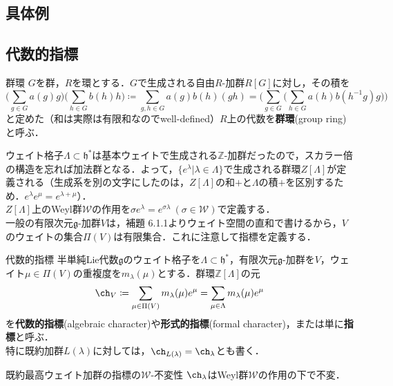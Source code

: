 \documentclass[rep_main]{subfiles}
\begin{document}
\subsection{具体例}
\subsection{代数的指標}

\begin{mydef}[label=def:group-ring]{群環}
	$G$を群，$R$を環とする．$G$で生成される自由$R$-加群$R[G]$に対し，その積を
	\begin{equation}
		\biggl(\sum_{g \in G} a(g)g \biggr)\biggl(\sum_{h \in G} b(h)h \biggr) \coloneqq \sum_{g, h \in G} a(g)b(h)(gh) = \biggl(\sum_{g \in G} \biggl(\sum_{h \in G} a(h)b(h^{-1}g)g \biggr) \biggr)
	\end{equation}
	と定めた（和は実際は有限和なのでwell-defined）$R$上の代数を\textbf{群環}(group ring)と呼ぶ．
\end{mydef}
ウェイト格子$\Lambda \subset \mathfrak{h}^*$は基本ウェイトで生成される$\mathbb{Z}$-加群だったので，スカラー倍の構造を忘れば加法群となる．よって，$\{e^\lambda | \lambda \in \Lambda\}$で生成される群環$Z[\Lambda]$が定義される（生成系を別の文字にしたのは，$Z[\Lambda]$の和$+$と$\Lambda$の積$+$を区別するため．$e^\lambda e^\mu = e^{\lambda + \mu}$）．\\
$Z[\Lambda]$上のWeyl群$\mathscr{W}$の作用を$\sigma e^\lambda = e^{\sigma\lambda}\ (\sigma \in \mathscr{W})$で定義する．\\
一般の有限次元$\mathfrak{g}$-加群$V$は，補題 6.1.1よりウェイト空間の直和で書けるから，$V$のウェイトの集合$\Pi(V)$は有限集合．これに注意して指標を定義する．
\begin{mydef}[label=def:alg-character]{代数的指標}
	半単純Lie代数$\mathfrak{g}$のウェイト格子を$\Lambda \subset \mathfrak{h}^*$，有限次元$\mathfrak{g}$-加群を$V$，ウェイト$\mu \in \Pi(V)$の重複度を$m_\lambda(\mu)$とする．群環$\mathbb{Z}[\Lambda]$の元
	\begin{equation}
		\ch_V \coloneqq \sum_{\mu \in \Pi(V)} m_\lambda(\mu)e^\mu = \sum_{\mu \in \Lambda} m_\lambda(\mu)e^\mu
	\end{equation}
	を\textbf{代数的指標}(algebraic character)や\textbf{形式的指標}(formal character)，または単に\textbf{指標}と呼ぶ．\\
	特に既約加群$L(\lambda)$に対しては，$\ch_{L(\lambda)} = \ch_\lambda$とも書く．
\end{mydef}
\begin{mylem}[label=lem:Weyl-stable-irr-ch]{既約最高ウェイト加群の指標の$\mathscr{W}$-不変性}
	$\ch_\lambda$はWeyl群$\mathscr{W}$の作用の下で不変．
\end{mylem}
\end{document}
